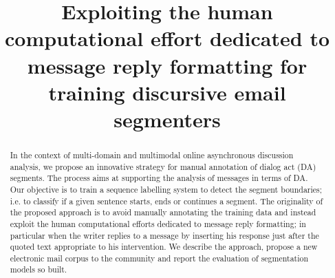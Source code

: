 \documentclass[11pt]{article}
\title{Exploiting the human computational effort dedicated to message reply formatting for training discursive email segmenters} %
\date{}
\author{}
\begin{document}
\maketitle

\begin{abstract}
In the context of multi-domain and multimodal online asynchronous discussion analysis, we propose an innovative strategy for manual annotation of dialog act (DA) segments. The process aims at supporting the analysis of messages in terms of DA.
Our objective is to train a sequence labelling system to detect the segment boundaries; i.e. to classify if a given sentence starts, ends or continues a segment.
The originality of the proposed approach is to avoid manually annotating the training data and instead exploit the human computational efforts dedicated to message reply formatting; in particular when the writer replies to a message by inserting his response just after the quoted text appropriate to his intervention.
%
We describe the approach, propose a new electronic mail corpus to the community and report the evaluation of segmentation models so built.
\end{abstract}





%
% 
\blfootnote{
    \hspace{-0.65cm}  %
}
\end{document}
